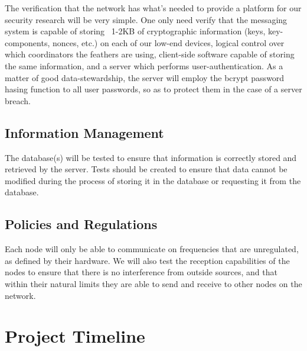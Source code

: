 \documentclass[tikz,a4paper,titlepage]{article}
\begin{document}
The verification that the network has what's needed to provide a platform for our security research will be very simple. One only need verify that the messaging system is capable of storing ~1-2KB of cryptographic information (keys, key-components, nonces, etc.) on each of our low-end devices, logical control over which coordinators the feathers are using, client-side software capable of storing the same information, and a server which performs user-authentication. As a matter of good data-stewardship, the server will employ the bcrypt password hasing function to all user passwords, so as to protect them in the case of a server breach.

\subsection{Information Management} %

The database(s) will be tested to ensure that information is correctly stored and retrieved by the server. Tests should be created to ensure that data cannot be modified during the process of storing it in the database or requesting it from the database. 

\subsection{Policies and Regulations}

Each node will only be able to communicate on frequencies that are unregulated, as defined by their hardware. We will also test the reception capabilities of the nodes to ensure that there is no interference from outside sources, and that within their natural limits they are able to send and receive to other nodes on the network.

\section{Project Timeline}
\end{document}

